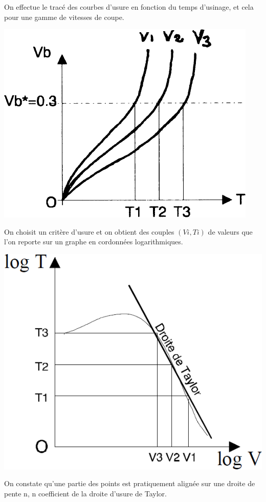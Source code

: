\documentclass[11pt,oneside]{article}
\begin{document}
\noindent \begin{minipage}[c]{.45\linewidth}
On effectue le tracé des courbes d'usure en fonction du temps d'usinage, et cela pour une gamme de vitesses de coupe.
\begin{center}
\includegraphics[width=.9\textwidth]{png/fig_09}
\end{center}
\end{minipage}\hfill
\begin{minipage}[c]{.45\linewidth}
On choisit un critère d'usure et on obtient des couples $(Vi, Ti)$ de valeurs que l'on reporte sur un graphe en cordonnées logarithmiques.
\begin{center}
\includegraphics[width=.9\textwidth]{png/fig_10}
\end{center}
\end{minipage}
On constate qu'une partie des  points est pratiquement alignée sur une droite de pente n, n coefficient de la droite d'usure de Taylor.
\end{document}
